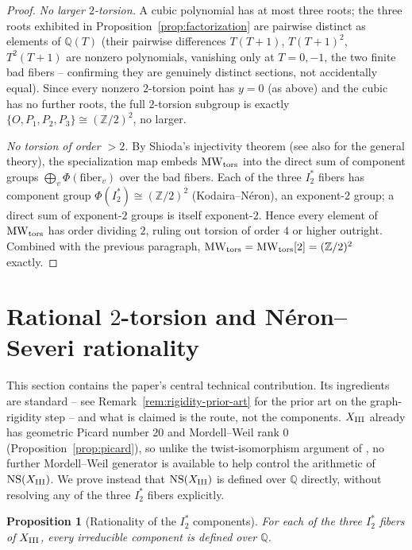 \documentclass[11pt]{amsart}
\newtheorem{proposition}[theorem]{Proposition}
\theoremstyle{definition}
\newcommand{\Q}{\mathbb{Q}}
\newcommand{\Z}{\mathbb{Z}}
\newcommand{\NS}{\mathrm{NS}}
\begin{document}
\begin{proof}
\emph{No larger $2$-torsion.} A cubic polynomial has at most three roots;
the three roots exhibited in Proposition~\ref{prop:factorization} are
pairwise distinct as elements of $\Q(T)$ (their pairwise differences
$T(T+1)$, $T(T+1)^2$, $T^2(T+1)$ are nonzero polynomials, vanishing only
at $T=0,-1$, the two finite bad fibers -- confirming they are genuinely
distinct sections, not accidentally equal). Since every nonzero
$2$-torsion point has $y=0$ (as above) and the cubic has no further
roots, the full $2$-torsion subgroup is exactly $\{O,P_1,P_2,P_3\}\cong
(\Z/2)^2$, no larger.

\emph{No torsion of order $>2$.} By Shioda's injectivity theorem
\cite{Shioda1990} (see also \cite{MirandaPersson1989} for the general
theory), the specialization map embeds $\mathrm{MW}_{\rm tors}$ into the
direct sum of component groups $\bigoplus_v\Phi(\text{fiber}_v)$ over the
bad fibers. Each of the three $I_2^*$ fibers has component group
$\Phi(I_2^*)\cong(\Z/2)^2$ (Kodaira--N\'eron), an exponent-$2$ group; a
direct sum of exponent-$2$ groups is itself exponent-$2$. Hence every
element of $\mathrm{MW}_{\rm tors}$ has order dividing $2$, ruling out
torsion of order $4$ or higher outright. Combined with the previous
paragraph, $\mathrm{MW}_{\rm tors}=\mathrm{MW}_{\rm tors}[2]=(\Z/2)^2$
exactly.
\end{proof}

\section{Rational $2$-torsion and N\'eron--Severi rationality}
\label{sec:NS}

This section contains the paper's central technical contribution. Its
ingredients are standard -- see Remark~\ref{rem:rigidity-prior-art} for
the prior art on the graph-rigidity step -- and what is claimed is the
route, not the components.
$X_{\rm III}$ already has geometric Picard number $20$ and Mordell--Weil
rank $0$ (Proposition~\ref{prop:picard}), so unlike the twist-isomorphism
argument of \cite{ClassesI_II}, no further Mordell--Weil generator is
available to help control the arithmetic of $\NS(X_{\rm III})$. We prove
instead that $\NS(X_{\rm III})$ is defined over $\Q$ directly, without
resolving any of the three $I_2^*$ fibers explicitly.

\begin{proposition}[Rationality of the $I_2^*$ components]
\label{prop:main-NS}
For each of the three $I_2^*$ fibers of $X_{\rm III}$, every irreducible
component is defined over $\Q$.
\end{proposition}
\end{document}
